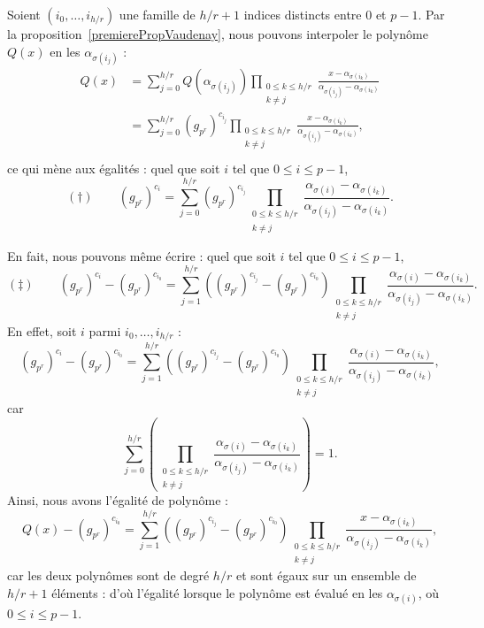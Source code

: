 \documentclass[a4paper, titlepage]{article}
\theoremstyle{definition}
\theoremstyle{remark}
\begin{document}
Soient $(i_0, \dots, i_{h/r})$ une famille de $h/r + 1$ indices distincts entre $0$ et $p-1$. Par la proposition~\ref{premierePropVaudenay}, nous pouvons interpoler le polynôme $Q(x)$ en les $\alpha_{\sigma(i_j)}$ :
\begin{align*}
Q(x) &= \sum_{j=0}^{h/r} Q\left(\alpha_{\sigma(i_j)}\right) \prod_{\substack{0\leqslant k\leqslant h/r \\ k \neq j}}\frac{x-\alpha_{\sigma(i_k)}}{\alpha_{\sigma(i_j)}-\alpha_{\sigma(i_k)}} \\
&= \sum_{j=0}^{h/r} (g_{p^r})^{c_{i_j}} \prod_{\substack{0\leqslant k\leqslant h/r \\ k \neq j}}\frac{x-\alpha_{\sigma(i_k)}}{\alpha_{\sigma(i_j)}-\alpha_{\sigma(i_k)}}, \\
\end{align*} 
ce qui mène aux égalités : quel que soit $i$ tel que $0\leqslant i \leqslant p-1$,
$$(\dagger) \qquad (g_{p^r})^{c_i} = \sum_{j=0}^{h/r} (g_{p^r})^{c_{i_j}}\prod_{\substack{0\leqslant k\leqslant h/r \\ k \neq j}} \frac{\alpha_{\sigma(i)}-\alpha_{\sigma(i_k)}}{\alpha_{\sigma(i_j)}-\alpha_{\sigma(i_k)}}.$$

En fait, nous pouvons même écrire : quel que soit $i$ tel que $0\leqslant i \leqslant p-1$,
$$(\ddagger) \qquad (g_{p^r})^{c_i} - (g_{p^r})^{c_{i_0}} = \sum_{j=1}^{h/r} \left((g_{p^r})^{c_{i_j}} - (g_{p^r})^{c_{i_0}} \right)\prod_{\substack{0\leqslant k\leqslant h/r \\ k \neq j}} \frac{\alpha_{\sigma(i)}-\alpha_{\sigma(i_k)}}{\alpha_{\sigma(i_j)}-\alpha_{\sigma(i_k)}}.$$
En effet, soit $i$ parmi $i_0, \dots, i_{h/r}$ :
$$(g_{p^r})^{c_i} - (g_{p^r})^{c_{i_0}} = \sum_{j=1}^{h/r} \left((g_{p^r})^{c_{i_j}} - (g_{p^r})^{c_{i_0}} \right)\prod_{\substack{0\leqslant k\leqslant h/r \\ k \neq j}} \frac{\alpha_{\sigma(i)}-\alpha_{\sigma(i_k)}}{\alpha_{\sigma(i_j)}-\alpha_{\sigma(i_k)}},$$
car $$\sum_{j=0}^{h/r} \left(\prod_{\substack{0\leqslant k\leqslant h/r \\ k \neq j}} \frac{\alpha_{\sigma(i)}-\alpha_{\sigma(i_k)}}{\alpha_{\sigma(i_j)}-\alpha_{\sigma(i_k)}}\right) = 1.$$
Ainsi, nous avons l'égalité de polynôme :
$$Q(x) - (g_{p^r})^{c_{i_0}} = \sum_{j=1}^{h/r} \left((g_{p^r})^{c_{i_j}} - (g_{p^r})^{c_{i_0}} \right)\prod_{\substack{0\leqslant k\leqslant h/r \\ k \neq j}} \frac{x-\alpha_{\sigma(i_k)}}{\alpha_{\sigma(i_j)}-\alpha_{\sigma(i_k)}},$$
car les deux polynômes sont de degré $h/r$ et sont égaux sur un ensemble de $h/r + 1$ éléments : d'où l'égalité lorsque le polynôme est évalué en les $\alpha_{\sigma(i)}$, où $0\leqslant i \leqslant p-1$.
\end{document}
